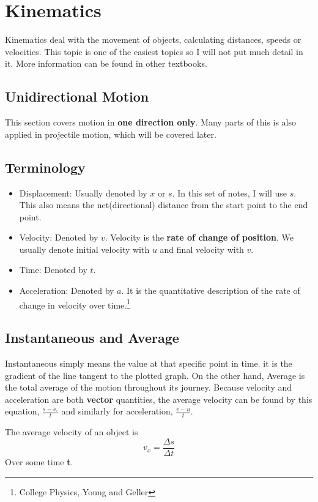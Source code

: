 \section{Kinematics}
Kinematics deal with the movement of objects, calculating distances, speeds or velocities. This topic is one of the easiest topics so I will not put much detail in it. More information can be found in other textbooks.
\subsection{Unidirectional Motion}
This section covers motion in \textbf{one direction only}. Many parts of this is also applied in projectile motion, which will be covered later.

\subsection{Terminology}
\begin{itemize}
\item Displacement: Usually denoted by $x$ or $s$. In this set of notes, I will use $s$. This also means the net(directional) distance from the start point to the end point.
\item Velocity: Denoted by $v$. Velocity is the \textbf{rate of change of position}. We usually denote initial velocity with $u$ and final velocity with $v$.
\item Time: Denoted by $t$. 
\item Acceleration: Denoted by $a$. It is the quantitative description of the rate of change in velocity over time.\footnote{College Physics, Young and Geller}
\end{itemize}

\subsection{Instantaneous and Average}\label{instant}
Instantaneous simply means the value at that specific point in time. it is the gradient of the line tangent to the plotted graph. On the other hand, Average is the total average of the motion throughout its journey. Because velocity and acceleration are both \textbf{vector} quantities, the average velocity can be found by this equation, $\frac{s - s_\circ}{t}$ and similarly for acceleration, $\frac{v - u}{t}$.

\begin{form}
The average velocity of an object is
$$v_x = \frac{\Delta s}{\Delta t}$$
Over some time \textbf{t}.
\end{form}

